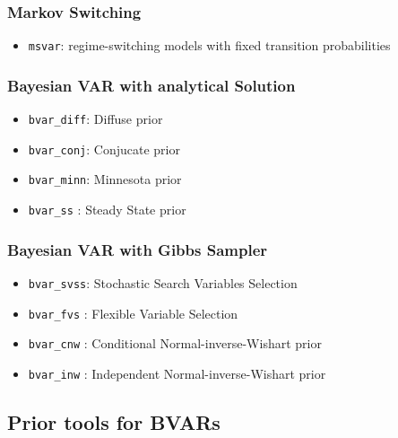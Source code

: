 \documentclass[
]{article}
\providecommand{\tightlist}{%
  \setlength{\itemsep}{0pt}\setlength{\parskip}{0pt}}
\begin{document}
\hypertarget{markov-switching}{%
\subsubsection{Markov Switching}\label{markov-switching}}

\begin{itemize}
\tightlist
\item
  \texttt{msvar}: regime-switching models with fixed transition probabilities
\end{itemize}

\hypertarget{bayesian-var-with-analytical-solution}{%
\subsubsection{Bayesian VAR with analytical Solution}\label{bayesian-var-with-analytical-solution}}

\begin{itemize}
\tightlist
\item
  \texttt{bvar\_diff}: Diffuse prior
\item
  \texttt{bvar\_conj}: Conjucate prior
\item
  \texttt{bvar\_minn}: Minnesota prior
\item
  \texttt{bvar\_ss} : Steady State prior
\end{itemize}

\hypertarget{bayesian-var-with-gibbs-sampler}{%
\subsubsection{Bayesian VAR with Gibbs Sampler}\label{bayesian-var-with-gibbs-sampler}}

\begin{itemize}
\tightlist
\item
  \texttt{bvar\_svss}: Stochastic Search Variables Selection
\item
  \texttt{bvar\_fvs} : Flexible Variable Selection
\item
  \texttt{bvar\_cnw} : Conditional Normal-inverse-Wishart prior
\item
  \texttt{bvar\_inw} : Independent Normal-inverse-Wishart prior
\end{itemize}

\hypertarget{prior-tools-for-bvars}{%
\subsection{Prior tools for BVARs}\label{prior-tools-for-bvars}}
\end{document}
